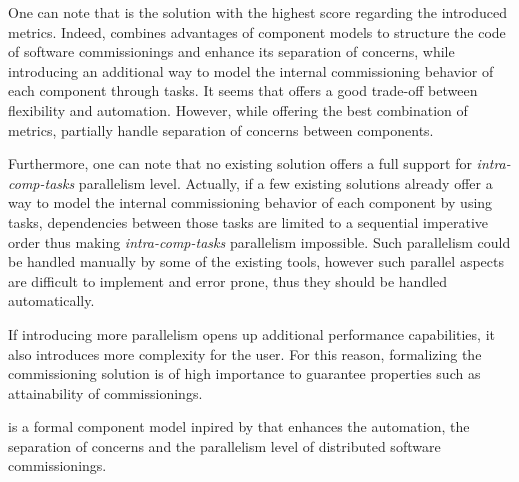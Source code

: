 One can note that \aeolus is the solution with the highest score
regarding the introduced metrics. Indeed, \aeolus combines advantages
of component models to structure the code of software commissionings
and enhance its separation of concerns, while introducing an
additional way to model the internal commissioning behavior of each
component through tasks. It seems that \aeolus offers a good trade-off
between flexibility and automation. However, while offering the best
combination of metrics, \aeolus partially handle separation of
concerns between components.

Furthermore, one can note that no existing solution offers a full
support for \emph{intra-comp-tasks} parallelism level. Actually, if a few
existing solutions already offer a way to model the internal
commissioning behavior of each component by using tasks, dependencies
between those tasks are limited to a sequential imperative order thus
making \emph{intra-comp-tasks} parallelism impossible. Such parallelism
could be handled manually by some of the existing tools, however such
parallel aspects are difficult to implement and error prone, thus they
should be handled automatically.

If introducing more parallelism opens up additional performance
capabilities, it also introduces more complexity for the user. For
this reason, formalizing the commissioning solution is of high
importance to guarantee properties such as attainability of
commissionings.

\begin{tcolorbox}[enhanced,attach boxed title to top left={yshift=-3mm,yshifttext=-1mm},
  colback=black!5!white,colframe=black!30,colbacktitle=black!60,
  title=Contribution,fonttitle=\bfseries,
  boxed title style={size=small,colframe=black!60,boxrule=0.2mm},
  boxrule=0.2mm]
  \mad is a formal component model inpired by \aeolus that enhances
  the automation, the separation of concerns and the parallelism level
  of distributed software commissionings.
\end{tcolorbox}


